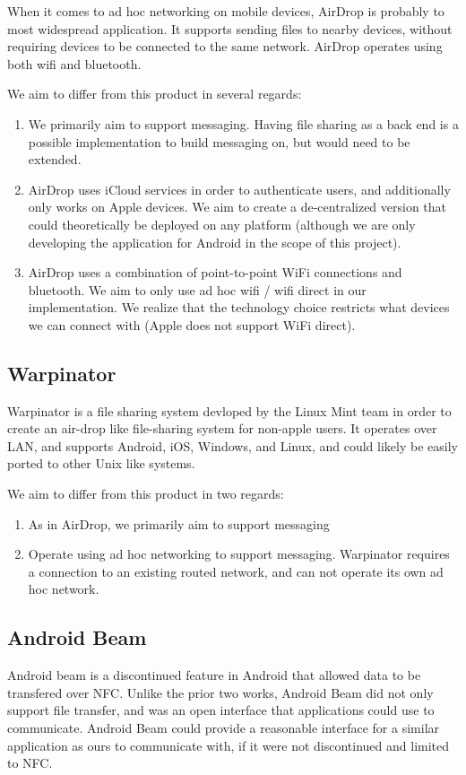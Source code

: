 \documentclass[10pt]{article}
\begin{document}
When it comes to ad hoc networking on mobile devices, AirDrop is probably to most widespread application. It supports sending files to nearby devices, without
requiring devices to be connected to the same network. AirDrop operates using both wifi and bluetooth.

We aim to differ from this product in several regards:
\begin{enumerate}
    \item We primarily aim to support messaging. Having file sharing as a back end is a possible implementation to build messaging on, but would need to be extended.
    \item AirDrop uses iCloud services in order to authenticate users, and additionally only works on Apple devices. We aim to create a de-centralized version that
          could theoretically be deployed on any platform (although we are only developing the application for Android in the scope of this project).
    \item AirDrop uses a combination of point-to-point WiFi connections and bluetooth. We aim to only use ad hoc wifi / wifi direct in our implementation. We realize
          that the technology choice restricts what devices we can connect with (Apple does not support WiFi direct).
\end{enumerate}

\subsection{Warpinator}

Warpinator is a file sharing system devloped by the Linux Mint team in order to create an air-drop like file-sharing system for non-apple users. It operates over
LAN, and supports Android, iOS, Windows, and Linux, and could likely be easily ported to other Unix like systems.

We aim to differ from this product in two regards:
\begin{enumerate}
    \item As in AirDrop, we primarily aim to support messaging
    \item Operate using ad hoc networking to support messaging. Warpinator requires a connection to an existing routed network, and can not operate its own ad hoc
          network.
\end{enumerate}

\subsection{Android Beam}
Android beam is a discontinued feature in Android that allowed data to be transfered over NFC. Unlike the prior two works, Android Beam did not only support file
transfer, and was an open interface that applications could use to communicate. Android Beam could provide a reasonable interface for a similar application as ours
to communicate with, if it were not discontinued and limited to NFC.
\end{document}
